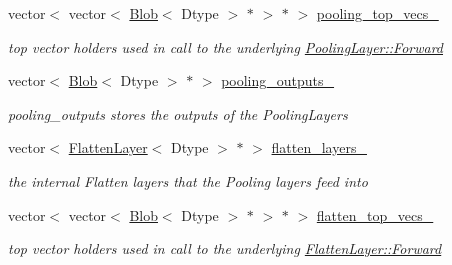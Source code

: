 \begin{DoxyCompactItemize}
\mbox{\label{classcaffe_1_1_s_p_p_layer_a4d672c3abfafe0ed34a9a5e71a38b3ff}} 
vector$<$ vector$<$ \mbox{\hyperlink{classcaffe_1_1_blob}{Blob}}$<$ Dtype $>$ $\ast$ $>$ $\ast$ $>$ \mbox{\hyperlink{classcaffe_1_1_s_p_p_layer_a4d672c3abfafe0ed34a9a5e71a38b3ff}{pooling\+\_\+top\+\_\+vecs\+\_\+}}
\begin{DoxyCompactList}\small\item\em top vector holders used in call to the underlying \mbox{\hyperlink{classcaffe_1_1_layer_ab57d272dabe8c709d2a785eebe72ca57}{Pooling\+Layer\+::\+Forward}} \end{DoxyCompactList}\item 
\mbox{\label{classcaffe_1_1_s_p_p_layer_a75044ffbb0220af3a057d03174d727ea}} 
vector$<$ \mbox{\hyperlink{classcaffe_1_1_blob}{Blob}}$<$ Dtype $>$ $\ast$ $>$ \mbox{\hyperlink{classcaffe_1_1_s_p_p_layer_a75044ffbb0220af3a057d03174d727ea}{pooling\+\_\+outputs\+\_\+}}
\begin{DoxyCompactList}\small\item\em pooling\+\_\+outputs stores the outputs of the Pooling\+Layers \end{DoxyCompactList}\item 
\mbox{\label{classcaffe_1_1_s_p_p_layer_a01cf22a0b6148f6c14e5d9d7421f49d3}} 
vector$<$ \mbox{\hyperlink{classcaffe_1_1_flatten_layer}{Flatten\+Layer}}$<$ Dtype $>$ $\ast$ $>$ \mbox{\hyperlink{classcaffe_1_1_s_p_p_layer_a01cf22a0b6148f6c14e5d9d7421f49d3}{flatten\+\_\+layers\+\_\+}}
\begin{DoxyCompactList}\small\item\em the internal Flatten layers that the Pooling layers feed into \end{DoxyCompactList}\item 
\mbox{\label{classcaffe_1_1_s_p_p_layer_acdd643b413ee71ce9df826452e874a6b}} 
vector$<$ vector$<$ \mbox{\hyperlink{classcaffe_1_1_blob}{Blob}}$<$ Dtype $>$ $\ast$ $>$ $\ast$ $>$ \mbox{\hyperlink{classcaffe_1_1_s_p_p_layer_acdd643b413ee71ce9df826452e874a6b}{flatten\+\_\+top\+\_\+vecs\+\_\+}}
\begin{DoxyCompactList}\small\item\em top vector holders used in call to the underlying \mbox{\hyperlink{classcaffe_1_1_layer_ab57d272dabe8c709d2a785eebe72ca57}{Flatten\+Layer\+::\+Forward}} \end{DoxyCompactList}\item 

\end{DoxyCompactItemize}
